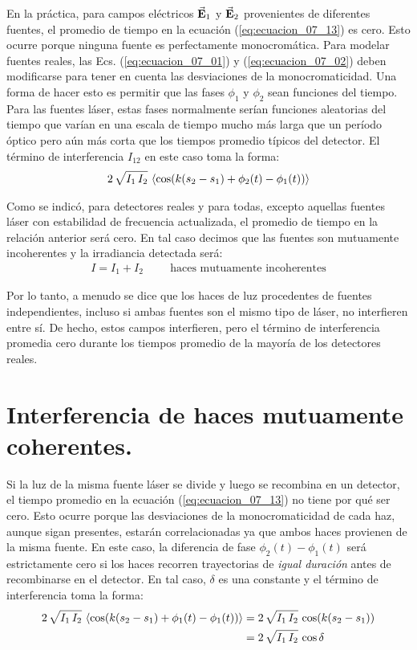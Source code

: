\documentclass[14pt]{extarticle}
\begin{document}
En la práctica, para campos eléctricos $\va{E}_{1}$ y $\va{E}_{2}$ provenientes de diferentes fuentes, el promedio de tiempo en la ecuación (\ref{eq:ecuacion_07_13}) es cero. Esto ocurre porque ninguna fuente es perfectamente monocromática. Para modelar fuentes reales, las Ecs. (\ref{eq:ecuacion_07_01}) y (\ref{eq:ecuacion_07_02}) deben modificarse para tener en cuenta las desviaciones de la monocromaticidad. Una forma de hacer esto es permitir que las fases $\phi_{1}$ y $\phi_{2}$ sean funciones del tiempo. Para las fuentes láser, estas fases normalmente serían funciones aleatorias del tiempo que varían en una escala de tiempo mucho más larga que un período óptico pero aún más corta que los tiempos promedio típicos del detector. El término de interferencia $I_{12}$ en este caso toma la forma:
\begin{align*}
2 \, \sqrt{I_{1} \, I_{2}} \, \expval{\cos(k (s_{2} - s_{1}) + \phi_{2} (t) - \phi_{1} (t))}
\end{align*}

Como se indicó, para detectores reales y para todas, excepto aquellas fuentes láser con estabilidad de frecuencia actualizada, el promedio de tiempo en la relación anterior será cero. En tal caso decimos que las fuentes son mutuamente incoherentes y la irradiancia detectada será:
\begin{align*}
I = I_{1} + I_{2} \hspace{1cm} \text{haces mutuamente incoherentes}
\end{align*}

Por lo tanto, a menudo se dice que los haces de luz procedentes de fuentes independientes, incluso si ambas fuentes son el mismo tipo de láser, no interfieren entre sí. De hecho, estos campos interfieren, pero el término de interferencia promedia cero durante los tiempos promedio de la mayoría de los detectores reales.

\section{Interferencia de haces mutuamente coherentes.}

Si la luz de la misma fuente láser se divide y luego se recombina en un detector, el tiempo promedio en la ecuación (\ref{eq:ecuacion_07_13}) no tiene por qué ser cero. Esto ocurre porque las desviaciones de la monocromaticidad de cada haz, aunque sigan presentes, estarán correlacionadas ya que ambos haces provienen de la misma fuente. En este caso, la diferencia de fase $\phi_{2} (t) - \phi_{1} (t)$ será estrictamente cero si los haces recorren trayectorias de \textit{igual duración} antes de recombinarse en el detector. En tal caso, $\delta$ es una constante y el término de interferencia toma la forma:
\begin{align*}
2 \, \sqrt{I_{1} \, I_{2}} \, \expval{\cos(k (s_{2} - s_{1}) + \phi_{1} (t) - \phi_{1} (t))} &= 2 \, \sqrt{I_{1} \, I_{2}} \, \cos(k (s_{2} - s_{1})) \\
&= 2 \, \sqrt{I_{1} \, I_{2}} \, \cos \delta
\end{align*}
\end{document}
